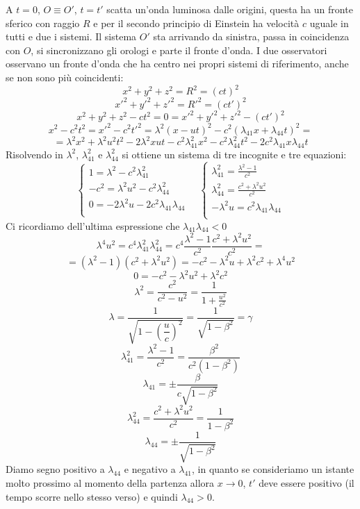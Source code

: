 A $t=0$, $O\equiv O'$, $t=t'$ scatta un'onda luminosa dalle origini, questa ha un fronte sferico con raggio $R$ e per il secondo principio di Einstein ha velocità $c$ uguale in tutti e due i sistemi. Il sistema $O'$ sta arrivando da sinistra, passa in coincidenza con $O$, si sincronizzano gli orologi e parte il fronte d'onda. I due osservatori osservano un fronte d'onda che ha centro nei propri sistemi di riferimento, anche se non sono più coincidenti:
\[x^2+y^2+z^2=R^2=(ct)^2\]
\[x'^2+y'^2+z'^2=R'^2=(ct')^2\]
\[x^2+y^2+z^2-ct^2=0=x'^2+y'^2+z'^2-(ct')^2\]
\[x^2-c^2t^2=x'^2-c^2t'^2=\lambda^2(x-ut)^2-c^2(\lambda_{41}x+\lambda_{44}t)^2=\]
\[=\lambda^2x^2+\lambda^2 u^2t^2-2\lambda^2 xut-c^2\lambda_{41}^2x^2-c^2\lambda_{44}^2t^2-2c^2\lambda_{41} x\lambda_{44} t\]
Risolvendo in $\lambda^2$, $\lambda_{41}^2$ e $\lambda_{44}^2$ si ottiene un sistema di tre incognite e tre equazioni:
\[\left\{
\begin{array}{l}
1=\lambda^2-c^2\lambda_{41}^2\\
-c^2=\lambda^2u^2-c^2\lambda_{44}^2\\
0=-2\lambda^2u-2c^2\lambda_{41}\lambda_{44}\\
\end{array}
\right.\quad \left\{
\begin{array}{l}
\lambda_{41}^2=\frac{\lambda^2-1}{c^2}\\
\lambda_{44}^2=\frac{c^2+\lambda^2u^2}{c^2}\\
-\lambda^2u=c^2\lambda_{41}\lambda_{44}\\

\end{array}\right.\]
Ci ricordiamo dell'ultima espressione che $\lambda_{41}\lambda_{44}<0$
\[\lambda^4u^2=c^4\lambda_{41}^2\lambda_{44}^2=c^4\frac{\lambda^2-1}{c^2}\frac{c^2+\lambda^2u^2}{c^2}=\]
\[=(\lambda^2-1)(c^2+\lambda^2u^2)=-c^2-\lambda^2u+\lambda^2c^2+\lambda^4u^2\]
\[0=-c^2-\lambda^2u^2+\lambda^2c^2\]
\[\lambda^2=\frac{c^2}{c^2-u^2}=\frac{1}{1+\frac{u^2}{c^2}}\]
\[\lambda=\dfrac{1}{\sqrt{1-\left(\dfrac{u}{c}\right)^2}}=\dfrac{1}{\sqrt{1-\beta^2}}=\gamma\]
\[\lambda_{41}^2=\frac{\lambda^2-1}{c^2}=\frac{\beta^2}{c^2(1-\beta^2)}\]
\[\lambda_{41}=\pm\frac{\beta}{c\sqrt{1-\beta^2}}\]
\[\lambda_{44}^2=\frac{c^2+\lambda^2u^2}{c^2}=\frac{1}{1-\beta^2}\]
\[\lambda_{44}=\pm\frac{1}{\sqrt{1-\beta^2}}\]
Diamo segno positivo a $\lambda_{44}$ e negativo a $\lambda_{41}$, in quanto se consideriamo un istante molto prossimo al momento della partenza allora $x\rightarrow 0$, $t'$ deve essere positivo (il tempo scorre nello stesso verso) e quindi $\lambda_{44}>0$.
